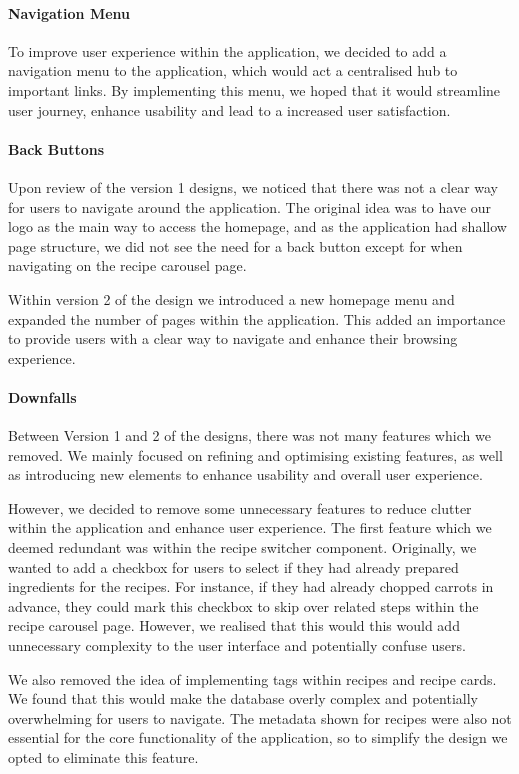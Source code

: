 \documentclass{article}
\begin{document}
\paragraph{Navigation Menu}
To improve user experience within the application, we decided to add a navigation menu to the application, which would act a centralised hub to important links. By implementing this menu, we hoped that it would streamline user journey, enhance usability and lead to a increased user satisfaction.

\paragraph{Back Buttons}
Upon review of the version 1 designs, we noticed that there was not a clear way for users to navigate around the application. The original idea was to have our logo as the main way to access the homepage, and as the application had shallow page structure, we did not see the need for a back button except for when navigating on the recipe carousel page.

Within version 2 of the design we introduced a new homepage menu and expanded the number of pages within the application. This added an importance to provide users with a clear way to navigate and enhance their browsing experience. 

\paragraph{Downfalls}
Between Version 1 and 2 of the designs, there was not many features which we removed. We mainly focused on refining and optimising existing features, as well as introducing new elements to enhance usability and overall user experience.

However, we decided to remove some unnecessary features to reduce clutter within the application and enhance user experience. The first feature which we deemed redundant was within the recipe switcher component. Originally, we wanted to add a checkbox for users to select if they had already prepared ingredients for the recipes. For instance, if they had already chopped carrots in advance, they could mark this checkbox to skip over related steps within the recipe carousel page. However, we realised that this would this would add unnecessary complexity to the user interface and potentially confuse users.

We also removed the idea of implementing tags within recipes and recipe cards. We found that this would make the database overly complex and potentially overwhelming for users to navigate. The metadata shown for recipes were also not essential for the core functionality of the application, so to simplify the design we opted to eliminate this feature.
\end{document}
